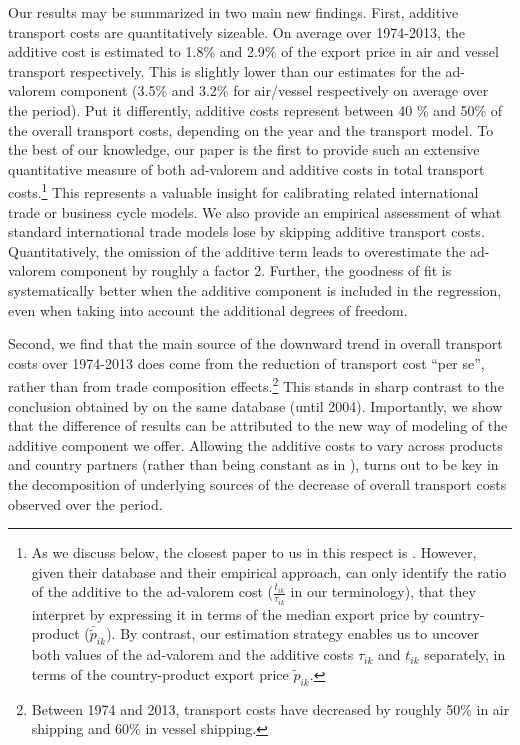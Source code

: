 \documentclass[a4paper,11pt]{article}
\begin{document}
Our results may be summarized in two main new findings. First, additive transport costs are quantitatively sizeable. On average over 1974-2013, the additive cost is estimated to 1.8\% and 2.9\% of the export price in air and vessel transport respectively. This is slightly lower than our estimates for the ad-valorem component (3.5\% and 3.2\% for air/vessel respectively on average over the period). Put it differently, additive costs represent between 40 \% and 50\% of the overall transport costs, depending on the year and the transport model. To the best of our knowledge, our paper is the first to provide such an extensive quantitative measure of both ad-valorem and additive costs in total transport costs.\footnote{As we discuss below, the closest paper to us in this respect is \citet{Irrazabal_2015}. However, given their database and their empirical approach, \citet{Irrazabal_2015} can only identify the ratio of the additive to the ad-valorem cost ($\frac{t_{ik}}{\tau_{ik}}$ in our terminology), that they interpret by expressing it in terms of the median export price by country-product ($\bar{\widetilde{p}}_{ik}$). By contrast, our estimation strategy enables us to uncover both values of the ad-valorem and the additive costs $\tau_{ik}$ and $t_{ik}$ separately, in terms of the country-product export price $\widetilde{p}_{ik}$.} This represents a valuable insight for calibrating related international trade or business cycle models. We also provide an empirical assessment of what standard international trade models lose by skipping additive transport costs. Quantitatively, the omission of the additive term leads to overestimate the ad-valorem component by roughly a factor 2. Further, the goodness of fit is systematically better when the additive component is included in the regression, even when taking into account the additional degrees of freedom.

Second, we find that the main source of the downward trend in overall transport costs over 1974-2013 does come from the reduction of transport cost ``per se'', rather than from trade composition effects.\footnote{Between 1974 and 2013, transport costs have decreased by roughly 50\% in air shipping and 60\% in vessel shipping.} This stands in sharp contrast to the conclusion obtained by \cite{hummels2007} on the same database (until 2004). Importantly, we show that the difference of results can be attributed to the new way of modeling of the additive component we offer. Allowing the additive costs to vary  across products and country partners (rather than being constant as in \cite{hummels2007}), turns out to be key in the decomposition of underlying sources of the decrease of overall transport costs observed over the period.\smallskip
\end{document}
